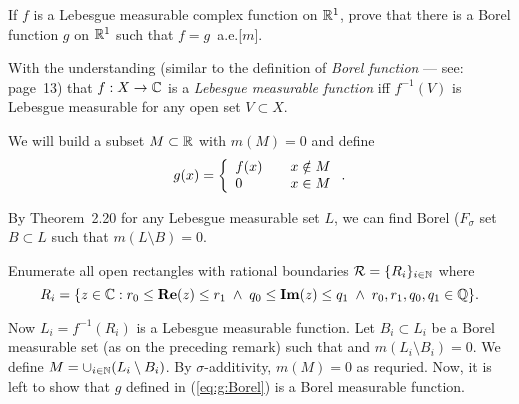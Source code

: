 \begin{enumerate}
\begin{excopy}
If $f$ is a Lebesgue measurable complex function on \(\mathbb{R}^1\),
prove that there is a Borel function $g$ on \(\mathbb{R}^1\) such that
\(f=g\)~a.e.[$m$].
\end{excopy}

With the understanding (similar to the definition
of \emph{Borel function} --- see:
\cite{RudinRCA80} page~13)
that
\(f:X\to \mathbb{C}\) is a \emph{Lebesgue measurable function} iff
\(f^{-1}(V)\) is Lebesgue measurable for any open set \(V\subset X\).

We will build a subset \(M \subset \mathbb{R}\) with \(m(M) = 0\)
and define
\begin{equation} \label{eq:g:Borel}
g(x) = \left\{\begin{array}{l@{\qquad}l}
             f(x) & x\notin M \\
             0    & x\in M
             \end{array}\right..
\end{equation}

By Theorem~2.20 for any Lebesgue measurable set $L$, we can find
Borel (\(F_{\sigma}\) set \(B\subset L\) such that \(m(L\setminus B) = 0\).

Enumerate all open rectangles with rational boundaries
\({\cal{R}} = \{R_i\}_{i\in\mathbb{N}}\)
where
\begin{equation*}
 R_i = \{z\in\mathbb{C} : r_0\leq \mathop{\bf Re}\nolimits(z) \leq r_1 \;\wedge\;
                  q_0\leq \mathop{\bf Im}\nolimits(z) \leq q_1 \;\wedge\;r_0,r_1,q_0,q_1\in\mathbb{Q}\}.
\end{equation*}

Now \(L_i = f^{-1}(R_i)\) is a Lebesgue measurable function.
Let \(B_i\subset L_i\) be a Borel measurable set
(as on the preceding remark) such that and \(m(L_i\setminus B_i) = 0\).
We define \(M = \cup_{i\in\mathbb{N}} (L_i\setminus B_i)\).
By \(\sigma\)-additivity, \(m(M)=0\) as requried.
Now, it is left to show
that $g$ defined in (\ref{eq:g:Borel}) is a Borel measurable function.


\end{enumerate}
